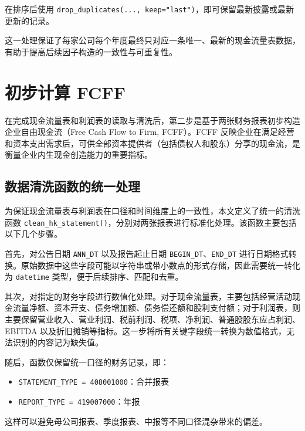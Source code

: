 \documentclass[a4paper,10pt]{article}
\begin{document}
在排序后使用 \texttt{drop\_duplicates(..., keep="last")}，即可保留最新披露或最新更新的记录。

这一处理保证了每家公司每个年度最终只对应一条唯一、最新的现金流量表数据，有助于提高后续因子构造的一致性与可重复性。


















\section{初步计算 FCFF}
在完成现金流量表和利润表的读取与清洗后，第二步是基于两张财务报表初步构造企业自由现金流（Free Cash Flow to Firm, FCFF）。FCFF 反映企业在满足经营和资本支出需求后，可供全部资本提供者（包括债权人和股东）分享的现金流，是衡量企业内生现金创造能力的重要指标。

\subsection{数据清洗函数的统一处理}
为保证现金流量表与利润表在口径和时间维度上的一致性，本文定义了统一的清洗函数 \linebreak \texttt{clean\_hk\_statement()}，分别对两张报表进行标准化处理。该函数主要包括以下几个步骤。

首先，对公告日期 \texttt{ANN\_DT} 以及报告起止日期 \texttt{BEGIN\_DT}、\texttt{END\_DT} 进行日期格式转换。原始数据中这些字段可能以字符串或带小数点的形式存储，因此需要统一转化为 \texttt{datetime} 类型，便于后续排序、匹配和去重。

其次，对指定的财务字段进行数值化处理。对于现金流量表，主要包括经营活动现金流量净额、资本开支、债务增加额、债务偿还额和股利支付额；对于利润表，则主要保留营业收入、营业利润、税前利润、税项、净利润、普通股股东应占利润、EBITDA 以及折旧摊销等指标。这一步将所有关键字段统一转换为数值格式，无法识别的内容记为缺失值。

随后，函数仅保留统一口径的财务记录，即：
\begin{itemize}
    \item \texttt{STATEMENT\_TYPE = 408001000}：合并报表
    \item \texttt{REPORT\_TYPE = 419007000}：年报
\end{itemize}

这样可以避免母公司报表、季度报表、中报等不同口径混杂带来的偏差。
\end{document}
